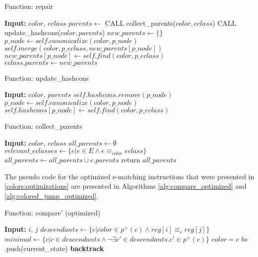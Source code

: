 \begin{algorithm}
\caption{Function: repair}
\label{alg:repair}
\begin{algorithmic}
\STATE \textbf{Input:} $color$, $eclass$
\STATE $parents \gets$ CALL collect\_parents($color, eclass$)
\STATE CALL update\_hashcons($color, parents$)
\STATE $new\_parents \gets \{\}$
    \STATE $p\_node \gets self.canonicalize(color, p\_node)$
        \STATE $self.merge(color, p\_eclass, new\_parents[p\_node])$
        \STATE $new\_parents[p\_node] \gets self.find(color, p\_eclass)$
    \ENDIF
\ENDFOR
{}
    \STATE $eclass.parents \gets new\_parents$
\ENDIF
\end{algorithmic}
\end{algorithm}

\begin{algorithm}
\caption{Function: update\_hashcons}
\label{alg:update_hashcons}
\begin{algorithmic}
\STATE \textbf{Input:} $color$, $parents$
    \STATE $self.hashcons.remove(p\_node)$
    \STATE $p\_node \gets self.canonicalize(color, p\_node)$
    \STATE $self.hashcons[p\_node] \gets self.find(color, p\_eclass)$
\ENDFOR
\ENDIF
\end{algorithmic}
\end{algorithm}

\begin{algorithm}
\caption{Function: collect\_parents}
\label{alg:collect_parents}
\begin{algorithmic}
\STATE \textbf{Input:} $color$, $eclass$
\STATE $all\_parents \gets \emptyset$
\STATE $relevant\_eclasses \gets \{e | e \in E \land e \equiv_{color} eclass\}$
    \STATE $all\_parents \gets all\_parents \cup e.parents$
\ENDFOR
\STATE return $all\_parents$
\end{algorithmic}
\end{algorithm}

The pseudo code for the optimized e-matching instructions that were presented in \autoref{colors:optimizations} are presented in Algorithms \ref{alg:compare_optimized} and \ref{alg:colored_jump_optimized}.

\begin{algorithm}
\caption{Function: compare' (optimized)}
\label{alg:compare_optimized}
\begin{algorithmic}
\STATE \textbf{Input:} $i$, $j$
    \STATE $descendants \gets \{ c | color \in p^+(c) \land reg[i] \equiv_c reg[j] \}$
    \STATE $minimal \gets \{ c | c \in descendants \land \lnot \exists c' \in descendants. c' \in p^+(c) \}$
        \STATE $color = c$
        \STATE $bs$.push(current\_state)
    \ENDFOR
    \STATE \textbf{backtrack}
\ENDIF
\end{algorithmic}
\end{algorithm}

